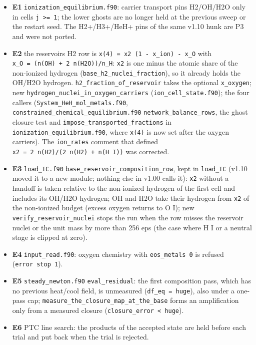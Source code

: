 \documentclass[english,a4paper]{my_memo}
\providecommand{\tightlist}{\setlength{\itemsep}{0pt}\setlength{\parskip}{0pt}}
\begin{document}
\begin{itemize}
\tightlist
\item
  \textbf{E1} \texttt{ionization\_equilibrium.f90}: carrier transport pins H2/OH/H2O only in cells \texttt{j\ \textgreater{}=\ 1}; the lower ghosts are no longer held at the previous sweep or the restart seed. The H2+/H3+/HeH+ pins of the same v1.10 hunk are P3 and were not ported.
\item
  \textbf{E2} the reservoir\textquotesingle s H2 row is \texttt{x(4)\ =\ x2\ (1\ -\ x\_ion)\ -\ x\_O} with \texttt{x\_O\ =\ (n(OH)\ +\ 2\ n(H2O))/n\_H}: \texttt{x2} is one minus the atomic share of the non-ionized hydrogen (\texttt{base\_h2\_nuclei\_fraction}), so it already holds the OH/H2O hydrogen. \texttt{h2\_fraction\_of\_reservoir} takes the optional \texttt{x\_oxygen}; new \texttt{hydrogen\_nuclei\_in\_oxygen\_carriers} (\texttt{ion\_cell\_state.f90}); the four callers (\texttt{System\_HeH\_mol\_metals.f90}, \texttt{constrained\_chemical\_equilibrium.f90} \texttt{network\_balance\_rows}, the ghost closure test and \texttt{impose\_transported\_fractions} in \texttt{ionization\_equilibrium.f90}, where \texttt{x(4)} is now set after the oxygen carriers). The \texttt{ion\_rates} comment that defined \texttt{x2\ =\ 2\ n(H2)/(2\ n(H2)\ +\ n(H\ I))} was corrected.
\item
  \textbf{E3} \texttt{load\_IC.f90} \texttt{base\_reservoir\_composition\_row}, kept in \texttt{load\_IC} (v1.10 moved it to a new module; nothing else in v1.00 calls it): \texttt{x2} without a handoff is taken relative to the non-ionized hydrogen of the first cell and includes its OH/H2O hydrogen; OH and H2O take their hydrogen from \texttt{x2} of the non-ionized budget (excess oxygen returns to O I); new \texttt{verify\_reservoir\_nuclei} stops the run when the row misses the reservoir nuclei or the unit mass by more than 256 eps (the case where H I or a neutral stage is clipped at zero).
\item
  \textbf{E4} \texttt{input\_read.f90}: oxygen chemistry with \texttt{eos\_metals\ 0} is refused (\texttt{error\ stop\ 1}).
\item
  \textbf{E5} \texttt{steady\_newton.f90} \texttt{eval\_residual}: the first composition pass, which has no previous heat/cool field, is unmeasured (\texttt{df\_eq\ =\ huge}), also under a one-pass cap; \texttt{measure\_the\_closure\_map\_at\_the\_base} forms an amplification only from a measured closure (\texttt{closure\_error\ \textless{}\ huge}).
\item
  \textbf{E6} PTC line search: the products of the accepted state are held before each trial and put back when the trial is rejected.

\end{itemize}
\end{document}
